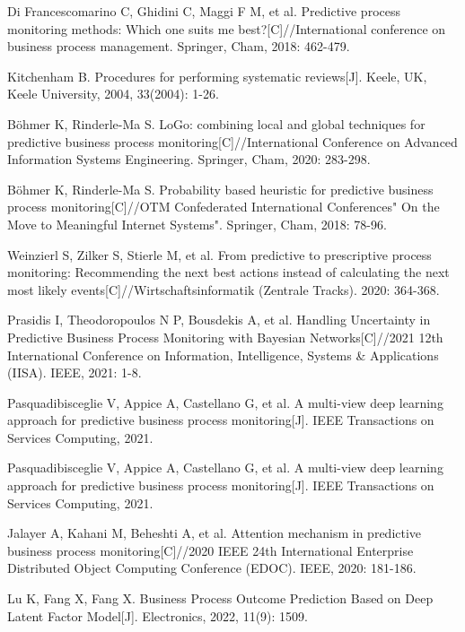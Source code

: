 \documentclass[runningheads]{llncs}
\begin{document}
		
	\newpage
	\begin{thebibliography}{99}
	
	Di Francescomarino C, Ghidini C, Maggi F M, et al. Predictive process monitoring methods: Which one suits me best?[C]//International conference on business process management. Springer, Cham, 2018: 462-479.
	
	Kitchenham B. Procedures for performing systematic reviews[J]. Keele, UK, Keele University, 2004, 33(2004): 1-26.
	
	Böhmer K, Rinderle-Ma S. LoGo: combining local and global techniques for predictive business process monitoring[C]//International Conference on Advanced Information Systems Engineering. Springer, Cham, 2020: 283-298.
	
	Böhmer K, Rinderle-Ma S. Probability based heuristic for predictive business process monitoring[C]//OTM Confederated International Conferences" On the Move to Meaningful Internet Systems". Springer, Cham, 2018: 78-96.
	
	Weinzierl S, Zilker S, Stierle M, et al. From predictive to prescriptive process monitoring: Recommending the next best actions instead of calculating the next most likely events[C]//Wirtschaftsinformatik (Zentrale Tracks). 2020: 364-368.
	
	Prasidis I, Theodoropoulos N P, Bousdekis A, et al. Handling Uncertainty in Predictive Business Process Monitoring with Bayesian Networks[C]//2021  12th International Conference on Information, Intelligence, Systems \& Applications (IISA). IEEE, 2021: 1-8.
	
	Pasquadibisceglie V, Appice A, Castellano G, et al. A multi-view deep learning approach for predictive business process monitoring[J]. IEEE Transactions on Services Computing, 2021.
	
	Pasquadibisceglie V, Appice A, Castellano G, et al. A multi-view deep learning approach for predictive business process monitoring[J]. IEEE Transactions on Services Computing, 2021.
	
	Jalayer A, Kahani M, Beheshti A, et al. Attention mechanism in predictive business process monitoring[C]//2020 IEEE 24th International Enterprise Distributed Object Computing Conference (EDOC). IEEE, 2020: 181-186.
	
	Lu K, Fang X, Fang X. Business Process Outcome Prediction Based on Deep Latent Factor Model[J]. Electronics, 2022, 11(9): 1509.
	

\end{thebibliography}
\end{document}
